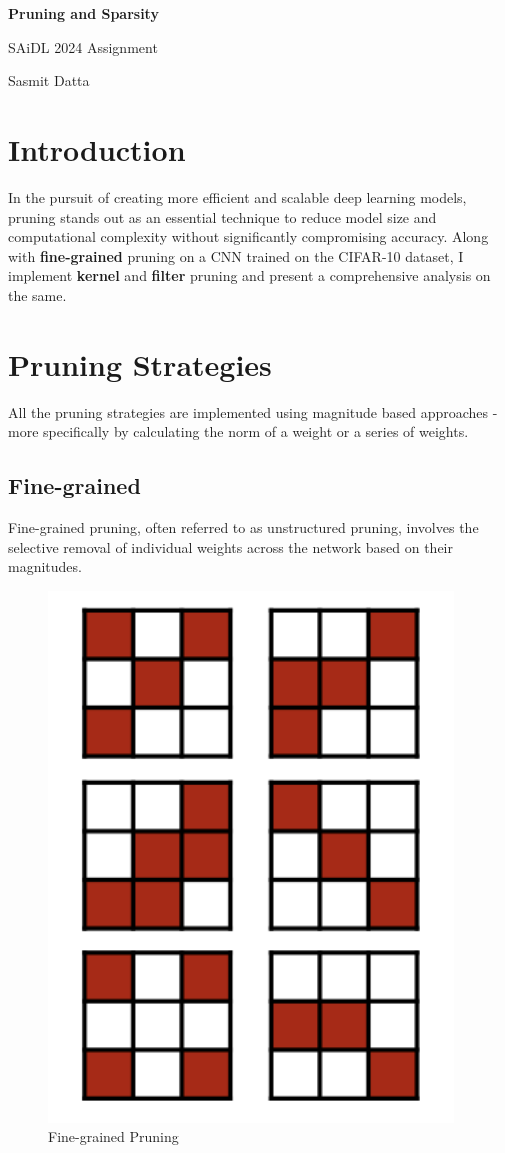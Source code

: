 \documentclass[12pt]{article}
\begin{document}
\begin{titlepage}
\centering
\vspace{0.5cm}
{\Huge\bfseries Pruning and Sparsity\par}

\vspace{0.5cm} %
{\Large SAiDL 2024 Assignment}

\vspace{1.5cm}
{\Large Sasmit Datta}
\end{titlepage}

\section{Introduction}
In the pursuit of creating more efficient and scalable deep learning models, pruning stands out as an essential technique to reduce model size and computational complexity without significantly compromising accuracy. Along with \textbf{fine-grained} pruning on a CNN trained on the CIFAR-10 dataset, I implement \textbf{kernel} and \textbf{filter} pruning and present a comprehensive analysis on the same.

\section{Pruning Strategies}
All the pruning strategies are implemented using magnitude based approaches - more specifically by calculating the norm of a weight or a series of weights.

\subsection{Fine-grained}
Fine-grained pruning, often referred to as unstructured pruning, involves the selective removal of individual weights across the network based on their magnitudes.

\begin{figure}[h]
\centering
\includegraphics[width=0.2\linewidth]{report_images/fine_pruning.png}
\caption{\label{fig:fine_pruning_diag}Fine-grained Pruning}
\end{figure}
\end{document}
